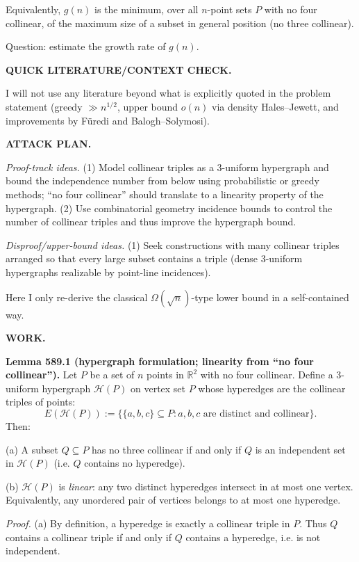 Equivalently, $g(n)$ is the minimum, over all $n$-point sets $P$ with no four collinear, of the maximum size of a subset in general position (no three collinear).

Question: estimate the growth rate of $g(n)$.

\bigskip
\noindent\textbf{QUICK LITERATURE/CONTEXT CHECK.}

I will not use any literature beyond what is explicitly quoted in the problem statement (greedy $\gg n^{1/2}$, upper bound $o(n)$ via density Hales--Jewett, and improvements by F\"uredi and Balogh--Solymosi).

\bigskip
\noindent\textbf{ATTACK PLAN.}

\emph{Proof-track ideas.}
(1) Model collinear triples as a 3-uniform hypergraph and bound the independence number from below using probabilistic or greedy methods; ``no four collinear'' should translate to a linearity property of the hypergraph.
(2) Use combinatorial geometry incidence bounds to control the number of collinear triples and thus improve the hypergraph bound.

\emph{Disproof/upper-bound ideas.}
(1) Seek constructions with many collinear triples arranged so that every large subset contains a triple (dense 3-uniform hypergraphs realizable by point-line incidences).

Here I only re-derive the classical $\Omega(\sqrt n)$-type lower bound in a self-contained way.

\bigskip
\noindent\textbf{WORK.}

\noindent\textbf{Lemma 589.1 (hypergraph formulation; linearity from ``no four collinear'').}
Let $P$ be a set of $n$ points in $\mathbb{R}^2$ with no four collinear.
Define a 3-uniform hypergraph $\mathcal{H}(P)$ on vertex set $P$ whose hyperedges are the collinear triples of points:
\[
E(\mathcal{H}(P)):=\{\{a,b,c\}\subseteq P: a,b,c \text{ are distinct and collinear}\}.
\]
Then:

(a) A subset $Q\subseteq P$ has no three collinear if and only if $Q$ is an independent set in $\mathcal{H}(P)$ (i.e. $Q$ contains no hyperedge).

(b) $\mathcal{H}(P)$ is \emph{linear}: any two distinct hyperedges intersect in at most one vertex.
Equivalently, any unordered pair of vertices belongs to at most one hyperedge.

\noindent\emph{Proof.}
(a) By definition, a hyperedge is exactly a collinear triple in $P$.
Thus $Q$ contains a collinear triple if and only if $Q$ contains a hyperedge, i.e. is not independent.

